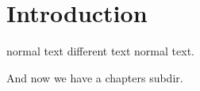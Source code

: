 \chapter{Introduction}
normal text { different text} normal text.

And now we have a chapters subdir.
